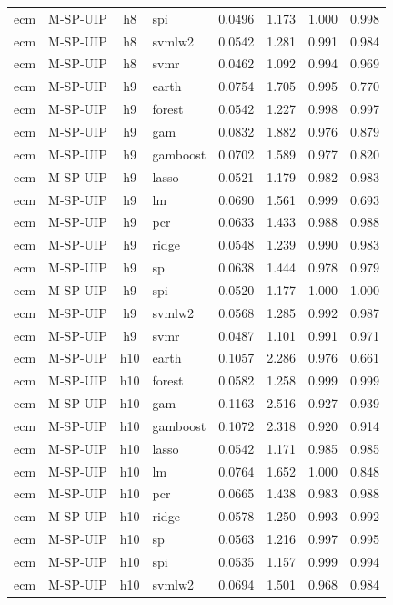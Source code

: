 \begin{ThreePartTable}
\begin{longtable}[t]{llclcccc}
ecm & M-SP-UIP & h8 & spi & 0.0496 & 1.173 & 1.000 & 0.998\\
ecm & M-SP-UIP & h8 & svmlw2 & 0.0542 & 1.281 & 0.991 & 0.984\\
ecm & M-SP-UIP & h8 & svmr & 0.0462 & 1.092 & 0.994 & 0.969\\
\addlinespace
ecm & M-SP-UIP & h9 & earth & 0.0754 & 1.705 & 0.995 & 0.770\\
ecm & M-SP-UIP & h9 & forest & 0.0542 & 1.227 & 0.998 & 0.997\\
ecm & M-SP-UIP & h9 & gam & 0.0832 & 1.882 & 0.976 & 0.879\\
ecm & M-SP-UIP & h9 & gamboost & 0.0702 & 1.589 & 0.977 & 0.820\\
ecm & M-SP-UIP & h9 & lasso & 0.0521 & 1.179 & 0.982 & 0.983\\
ecm & M-SP-UIP & h9 & lm & 0.0690 & 1.561 & 0.999 & 0.693\\
ecm & M-SP-UIP & h9 & pcr & 0.0633 & 1.433 & 0.988 & 0.988\\
ecm & M-SP-UIP & h9 & ridge & 0.0548 & 1.239 & 0.990 & 0.983\\
ecm & M-SP-UIP & h9 & sp & 0.0638 & 1.444 & 0.978 & 0.979\\
ecm & M-SP-UIP & h9 & spi & 0.0520 & 1.177 & 1.000 & 1.000\\
ecm & M-SP-UIP & h9 & svmlw2 & 0.0568 & 1.285 & 0.992 & 0.987\\
ecm & M-SP-UIP & h9 & svmr & 0.0487 & 1.101 & 0.991 & 0.971\\
\addlinespace
ecm & M-SP-UIP & h10 & earth & 0.1057 & 2.286 & 0.976 & 0.661\\
ecm & M-SP-UIP & h10 & forest & 0.0582 & 1.258 & 0.999 & 0.999\\
ecm & M-SP-UIP & h10 & gam & 0.1163 & 2.516 & 0.927 & 0.939\\
ecm & M-SP-UIP & h10 & gamboost & 0.1072 & 2.318 & 0.920 & 0.914\\
ecm & M-SP-UIP & h10 & lasso & 0.0542 & 1.171 & 0.985 & 0.985\\
ecm & M-SP-UIP & h10 & lm & 0.0764 & 1.652 & 1.000 & 0.848\\
ecm & M-SP-UIP & h10 & pcr & 0.0665 & 1.438 & 0.983 & 0.988\\
ecm & M-SP-UIP & h10 & ridge & 0.0578 & 1.250 & 0.993 & 0.992\\
ecm & M-SP-UIP & h10 & sp & 0.0563 & 1.216 & 0.997 & 0.995\\
ecm & M-SP-UIP & h10 & spi & 0.0535 & 1.157 & 0.999 & 0.994\\
ecm & M-SP-UIP & h10 & svmlw2 & 0.0694 & 1.501 & 0.968 & 0.984\\

\end{longtable}
\end{ThreePartTable}
